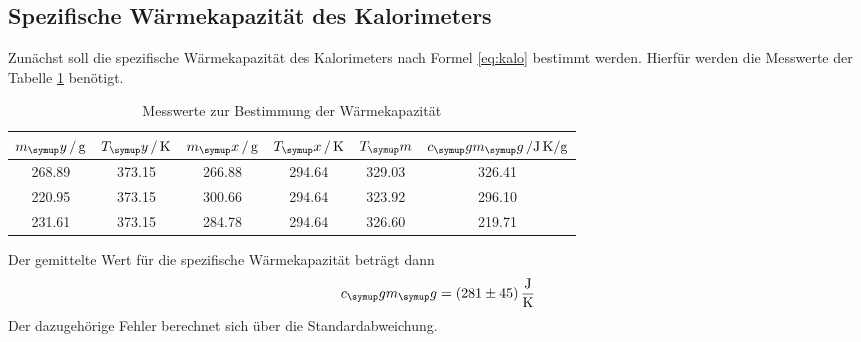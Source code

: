 \subsection{Spezifische Wärmekapazität des Kalorimeters}
Zunächst soll die spezifische Wärmekapazität des Kalorimeters nach Formel
\eqref{eq:kalo} bestimmt werden. Hierfür werden die Messwerte der Tabelle
\ref{tab:kalo} benötigt.
\begin{table}
  \centering
  \begin{tabular}{c c c c c c}
    \toprule
    $m_\su{y}\,/\gr$ & $T_\su{y}\,/\Kel$ & $m_\su{x}\,/\gr$ & $T_\su{x}\,/\Kel$
    & $T_\su{m}$ & $c_\su{g}m_\su{g}\,/\si{\joule\per\gram\kelvin}$ \\
    \midrule
    268.89 & 373.15 & 266.88 & 294.64 & 329.03 & 326.41\\
    220.95 & 373.15 & 300.66 & 294.64 & 323.92 & 296.10\\
    231.61 & 373.15 & 284.78 & 294.64 & 326.60 & 219.71\\
    \bottomrule
  \end{tabular}
  \caption{Messwerte zur Bestimmung der Wärmekapazität}
  \label{tab:kalo}
\end{table}
Der gemittelte Wert für die spezifische Wärmekapazität beträgt dann
\begin{equation*}
  c_\su{g}m_\su{g} = (281\pm45)\,\si{\joule\per\kelvin}
\end{equation*}
Der dazugehörige Fehler berechnet sich über die Standardabweichung.
\newpage
